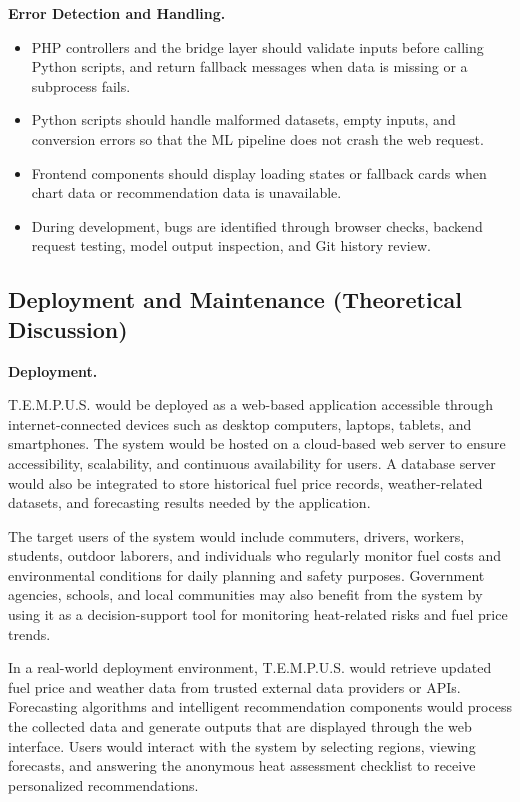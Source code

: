 \documentclass[12pt]{article}
\begin{document}
\medskip
\noindent\textbf{Error Detection and Handling.}
\begin{itemize}
    \item PHP controllers and the bridge layer should validate inputs before calling Python scripts, and return fallback messages when data is missing or a subprocess fails.
    \item Python scripts should handle malformed datasets, empty inputs, and conversion errors so that the ML pipeline does not crash the web request.
    \item Frontend components should display loading states or fallback cards when chart data or recommendation data is unavailable.
    \item During development, bugs are identified through browser checks, backend request testing, model output inspection, and Git history review.
\end{itemize}

\subsection{Deployment and Maintenance (Theoretical Discussion)}

\noindent\textbf{Deployment.}

T.E.M.P.U.S. would be deployed as a web-based application accessible through internet-connected devices such as desktop computers, laptops, tablets, and smartphones. The system would be hosted on a cloud-based web server to ensure accessibility, scalability, and continuous availability for users. A database server would also be integrated to store historical fuel price records, weather-related datasets, and forecasting results needed by the application.

The target users of the system would include commuters, drivers, workers, students, outdoor laborers, and individuals who regularly monitor fuel costs and environmental conditions for daily planning and safety purposes. Government agencies, schools, and local communities may also benefit from the system by using it as a decision-support tool for monitoring heat-related risks and fuel price trends.

In a real-world deployment environment, T.E.M.P.U.S. would retrieve updated fuel price and weather data from trusted external data providers or APIs. Forecasting algorithms and intelligent recommendation components would process the collected data and generate outputs that are displayed through the web interface. Users would interact with the system by selecting regions, viewing forecasts, and answering the anonymous heat assessment checklist to receive personalized recommendations.
\end{document}
